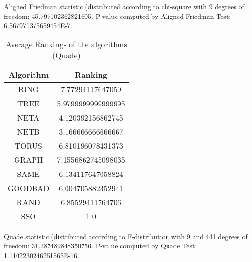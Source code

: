 \documentclass[a4paper,10pt]{article}
\begin{document}
\begin{landscape}
Aligned Friedman statistic (distributed according to chi-square with 9 degrees of freedom: 45.797102362821605. 
P-value computed by Aligned Friedman Test: 6.567971375659454E-7.\newline


\newpage

\begin{table}[!htp]
\centering
\caption{Average Rankings of the algorithms (Quade)
}\begin{tabular}{c|c}
Algorithm&Ranking\\
\hline
 RING&7.77294117647059\\
 TREE&5.9799999999999995\\
 NETA&4.120392156862745\\
 NETB&3.166666666666667\\
 TORUS&6.810196078431373\\
 GRAPH&7.1556862745098035\\
 SAME&6.134117647058824\\
 GOODBAD&6.004705882352941\\
 RAND&6.85529411764706\\
 SSO&1.0\\
\end{tabular}
\end{table}
Quade statistic (distributed according to F-distribution with 9 and 441 degrees of freedom: 31.287489848350756. 
P-value computed by Quade Test: 1.1102230246251565E-16.\newline


\newpage


\end{landscape}
\end{document}
